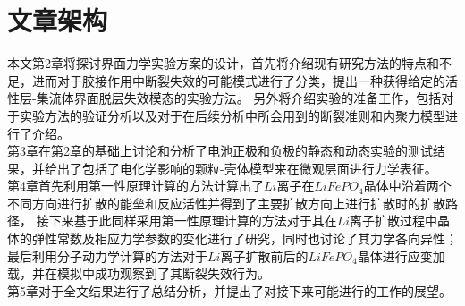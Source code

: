 \section{文章架构}
本文第2章将探讨界面力学实验方案的设计，首先将介绍现有研究方法的特点和不足，进而对于胶接作用中断裂失效的可能模式进行了分类，提出一种获得给定的活性层-集流体界面脱层失效模态的实验方法。 另外将介绍实验的准备工作，包括对于实验方法的验证分析以及对于在后续分析中所会用到的断裂准则和内聚力模型进行了介绍。 \\
\indent
第3章在第2章的基础上讨论和分析了电池正极和负极的静态和动态实验的测试结果，并给出了包括了电化学影响的颗粒-壳体模型来在微观层面进行力学表征。 \\
\indent 第4章首先利用第一性原理计算的方法计算出了$Li$离子在$LiFePO_4$晶体中沿着两个不同方向进行扩散的能垒和反应活性并得到了主要扩散方向上进行扩散时的扩散路径， 接下来基于此同样采用第一性原理计算的方法对于其在$Li$离子扩散过程中晶体的弹性常数及相应力学参数的变化进行了研究，同时也讨论了其力学各向异性；最后利用分子动力学计算的方法对于$Li$离子扩散前后的$LiFePO_4$晶体进行应变加载，并在模拟中成功观察到了其断裂失效行为。 \\
\indent
第5章对于全文结果进行了总结分析，并提出了对接下来可能进行的工作的展望。